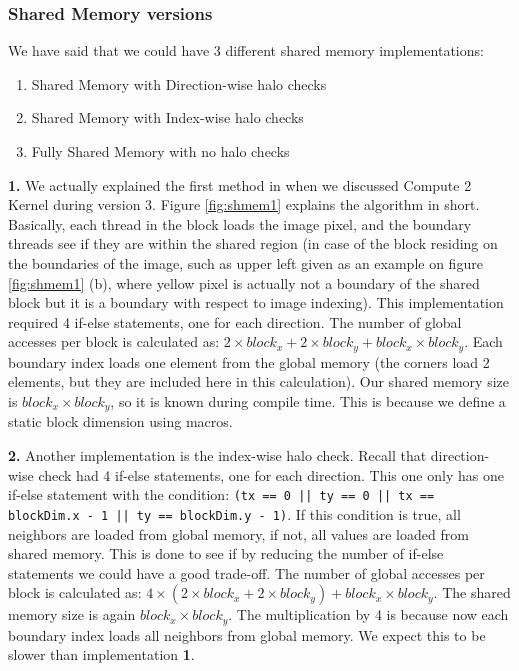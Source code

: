 \documentclass[12pt,reqno]{amsart}
\newcommand{\code}[1]{\texttt{#1}}
\begin{document}
\clearpage
\subsubsection{Shared Memory versions}
We have said that we could have 3 different shared memory implementations:
\begin{enumerate}
	\item Shared Memory with Direction-wise halo checks
	\item Shared Memory with Index-wise halo checks
	\item Fully Shared Memory with no halo checks
\end{enumerate}

\textbf{1.} We actually explained the first method in when we discussed Compute 2 Kernel during version 3. Figure \ref{fig:shmem1} explains the algorithm in short. Basically, each thread in the block loads the image pixel, and the boundary threads see if they are within the shared region (in case of the block residing on the boundaries of the image, such as upper left given as an example on figure \ref{fig:shmem1} (b), where yellow pixel is actually not a boundary of the shared block but it is a boundary with respect to image indexing). This implementation required 4 if-else statements, one for each direction. The number of global accesses per block is calculated as: $2 \times block_x + 2 \times block_y + block_x \times block_y$. Each boundary index loads one element from the global memory (the corners load 2 elements, but they are included here in this calculation). Our shared memory size is $block_x \times block_y$, so it is known during compile time. This is because we define a static block dimension using macros.

\textbf{2.} Another implementation is the index-wise halo check. Recall that direction-wise check had 4 if-else statements, one for each direction. This one only has one if-else statement with the condition: \code{(tx == 0 || ty == 0 || tx == blockDim.x - 1 || ty == blockDim.y - 1)}. If this condition is true, all neighbors are loaded from global memory, if not, all values are loaded from shared memory. This is done to see if by reducing the number of if-else statements we could have a good trade-off. The number of global accesses per block is calculated as: $4 \times (2 \times block_x + 2 \times block_y) + block_x \times block_y$. The shared memory size is again $block_x \times block_y$. The multiplication by 4 is because now each boundary index loads all neighbors from global memory. We expect this to be slower than implementation \textbf{1}.
\end{document}
